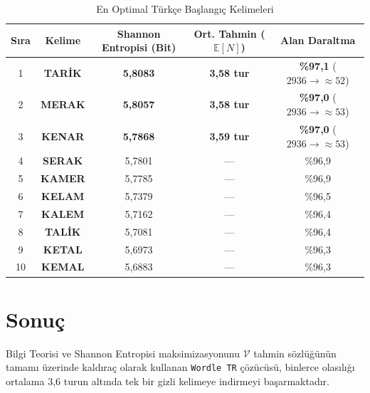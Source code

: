 \documentclass[11pt,a4paper]{article}
\begin{document}
\begin{table}[ht]
\centering
\caption{En Optimal Türkçe Başlangıç Kelimeleri}
\label{tab:top_starters}
\vspace{4pt}
\begin{tabular}{c c c c c}
\toprule
\textbf{Sıra} & \textbf{Kelime} & \textbf{Shannon Entropisi (Bit)} & \textbf{Ort. Tahmin ($\mathbb{E}[N]$)} & \textbf{Alan Daraltma} \\
\midrule
1 & \textbf{TARİK} & \textbf{5,8083} & \textbf{3,58 tur} & \textbf{\%97,1} ($2936 \to \approx 52$) \\
2 & \textbf{MERAK} & \textbf{5,8057} & \textbf{3,58 tur} & \textbf{\%97,0} ($2936 \to \approx 53$) \\
3 & \textbf{KENAR} & \textbf{5,7868} & \textbf{3,59 tur} & \textbf{\%97,0} ($2936 \to \approx 53$) \\
4 & \textbf{SERAK} & 5,7801 & --- & \%96,9 \\
5 & \textbf{KAMER} & 5,7785 & --- & \%96,9 \\
6 & \textbf{KELAM} & 5,7379 & --- & \%96,5 \\
7 & \textbf{KALEM} & 5,7162 & --- & \%96,4 \\
8 & \textbf{TALİK} & 5,7081 & --- & \%96,4 \\
9 & \textbf{KETAL} & 5,6973 & --- & \%96,3 \\
10 & \textbf{KEMAL} & 5,6883 & --- & \%96,3 \\
\bottomrule
\end{tabular}
\end{table}

\section{Sonuç}
Bilgi Teorisi ve Shannon Entropisi maksimizasyonunu $\mathcal{V}$ tahmin sözlüğünün tamamı üzerinde kaldıraç olarak kullanan \texttt{Wordle TR} çözücüsü, binlerce olasılığı ortalama 3,6 turun altında tek bir gizli kelimeye indirmeyi başarmaktadır.
\end{document}
